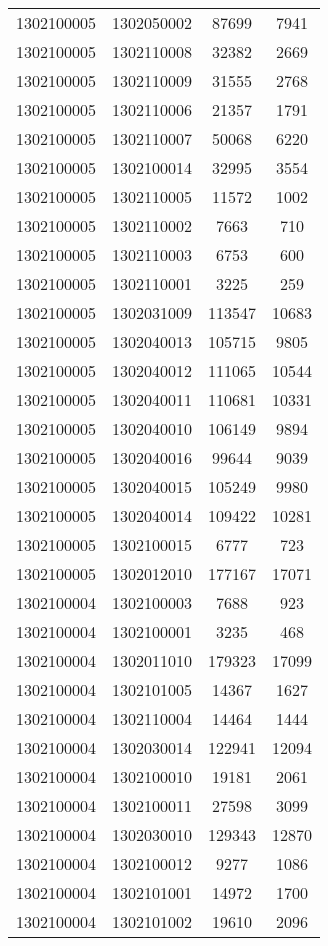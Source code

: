 \begin{longtable}[h]{llcc}
		1302100005 & 1302050002 & 87699 & 7941\\
		1302100005 & 1302110008 & 32382 & 2669\\
		1302100005 & 1302110009 & 31555 & 2768\\
		1302100005 & 1302110006 & 21357 & 1791\\
		1302100005 & 1302110007 & 50068 & 6220\\
		1302100005 & 1302100014 & 32995 & 3554\\
		1302100005 & 1302110005 & 11572 & 1002\\
		1302100005 & 1302110002 & 7663 & 710\\
		1302100005 & 1302110003 & 6753 & 600\\
		1302100005 & 1302110001 & 3225 & 259\\
		1302100005 & 1302031009 & 113547 & 10683\\
		1302100005 & 1302040013 & 105715 & 9805\\
		1302100005 & 1302040012 & 111065 & 10544\\
		1302100005 & 1302040011 & 110681 & 10331\\
		1302100005 & 1302040010 & 106149 & 9894\\
		1302100005 & 1302040016 & 99644 & 9039\\
		1302100005 & 1302040015 & 105249 & 9980\\
		1302100005 & 1302040014 & 109422 & 10281\\
		1302100005 & 1302100015 & 6777 & 723\\
		1302100005 & 1302012010 & 177167 & 17071\\
		1302100004 & 1302100003 & 7688 & 923\\
		1302100004 & 1302100001 & 3235 & 468\\
		1302100004 & 1302011010 & 179323 & 17099\\
		1302100004 & 1302101005 & 14367 & 1627\\
		1302100004 & 1302110004 & 14464 & 1444\\
		1302100004 & 1302030014 & 122941 & 12094\\
		1302100004 & 1302100010 & 19181 & 2061\\
		1302100004 & 1302100011 & 27598 & 3099\\
		1302100004 & 1302030010 & 129343 & 12870\\
		1302100004 & 1302100012 & 9277 & 1086\\
		1302100004 & 1302101001 & 14972 & 1700\\
		1302100004 & 1302101002 & 19610 & 2096\\

\end{longtable}
